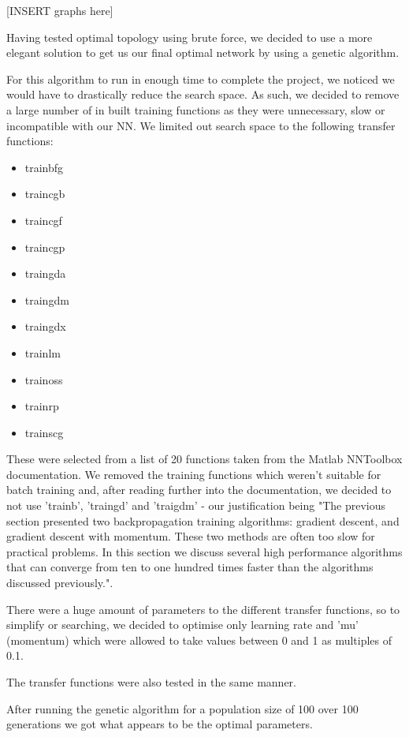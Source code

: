\documentclass[11pt]{article}
\begin{document}
[INSERT graphs here]

Having tested optimal topology using brute force, we decided to use a more elegant solution to get us our final optimal network by using a genetic algorithm.

For this algorithm to run in enough time to complete the project, we noticed we would have to drastically reduce the search space. As such, we decided to remove a large number of in built training functions as they were unnecessary, slow or incompatible with our NN.
We limited out search space to the following transfer functions:
\begin{multicols}{2}
\begin{itemize}
  \item trainbfg
  \item traincgb
  \item traincgf
  \item traincgp
  \item traingda
  \item traingdm
  \item traingdx
  \item trainlm
  \item trainoss
  \item trainrp
  \item trainscg 
\end{itemize}
\end{multicols}

These were selected from a list of 20 functions taken from the Matlab NNToolbox documentation. We removed the training functions which weren't suitable for batch training and, after reading further into the documentation, we decided to not use 'trainb', 'traingd' and 'traigdm' - our justification being "The previous section presented two backpropagation training algorithms: gradient descent, and gradient descent with momentum. These two methods are often too slow for practical problems. In this section we discuss several high performance algorithms that can converge from ten to one hundred times faster than the algorithms discussed previously.".

There were a huge amount of parameters to the different transfer functions, so to simplify or searching, we decided to optimise only learning rate and 'mu' (momentum) which were allowed to take values between 0 and 1 as multiples of 0.1.

The transfer functions were also tested in the same manner.

After running the genetic algorithm for a population size of 100 over 100 generations we got 
what appears to be the optimal parameters.
\end{document}

